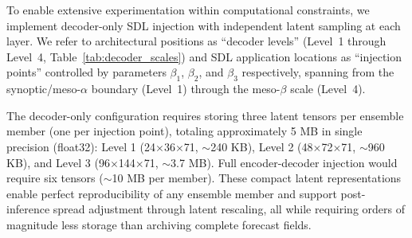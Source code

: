 \documentclass[11pt]{article}
\begin{document}

To enable extensive experimentation within computational constraints, we implement decoder-only SDL injection with independent latent sampling at each layer. We refer to architectural positions as ``decoder levels'' (Level~1 through Level~4, Table~\ref{tab:decoder_scales}) and SDL application locations as ``injection points'' controlled by parameters $\beta_1$, $\beta_2$, and $\beta_3$ respectively, spanning from the synoptic/meso-$\alpha$ boundary (Level~1) through the meso-$\beta$ scale (Level~4).

The decoder-only configuration requires storing three latent tensors per ensemble member (one per injection point), totaling approximately 5 MB in single precision (float32): Level 1 (24$\times$36$\times$71, $\sim$240 KB), Level 2 (48$\times$72$\times$71, $\sim$960 KB), and Level 3 (96$\times$144$\times$71, $\sim$3.7 MB). Full encoder-decoder injection would require six tensors ($\sim$10 MB per member). These compact latent representations enable perfect reproducibility of any ensemble member and support post-inference spread adjustment through latent rescaling, all while requiring orders of magnitude less storage than archiving complete forecast fields.
\end{document}
